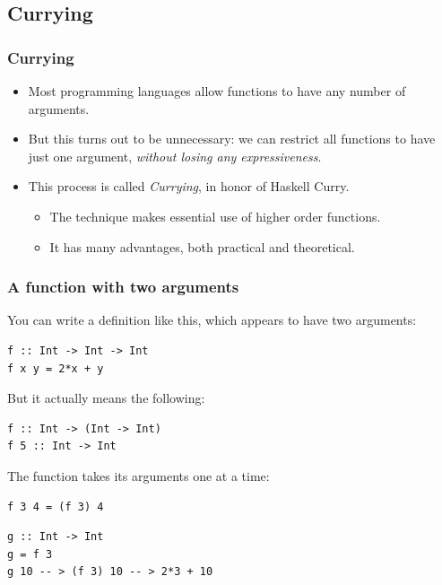 \documentclass{beamer}
\begin{document}
\subsection{Currying}
\begin{frame}[fragile]
\frametitle{Currying}

\begin{itemize}
\item Most programming languages allow functions to have any number
  of arguments.
\item But this turns out to be unnecessary: we can restrict all
  functions to have just one argument, \emph{without losing any
    expressiveness}.
\item This process is called \emph{Currying}, in honor of Haskell
  Curry.
  \begin{itemize}
  \item The technique makes essential use of higher order
    functions.
  \item It has many advantages, both practical and theoretical.
  \end{itemize}
\end{itemize}

\end{frame}

\begin{frame}[fragile]
\frametitle{A function with two arguments}

You can write a definition like this, which appears to have two
arguments:

\begin{verbatim}
f :: Int -> Int -> Int
f x y = 2*x + y
\end{verbatim}

But it actually means the following:

\begin{verbatim}
f :: Int -> (Int -> Int)
f 5 :: Int -> Int
\end{verbatim}

The function takes its arguments one at a time:

\begin{verbatim}
f 3 4 = (f 3) 4
\end{verbatim}

\begin{verbatim}
g :: Int -> Int
g = f 3
g 10 -- > (f 3) 10 -- > 2*3 + 10
\end{verbatim}

\end{frame}
\end{document}

